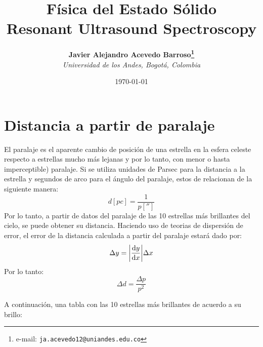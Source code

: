 \documentclass[12pt]{article}
\begin{document}
\title{Física del Estado Sólido \\ Resonant Ultrasound Spectroscopy}

\author{
\textbf{Javier Alejandro Acevedo Barroso\thanks{e-mail: \texttt{ja.acevedo12@uniandes.edu.co}}}\\
\textit{Universidad de los Andes, Bogotá, Colombia}\\
 }%

\date{\today}
\maketitle %


\normalsize
\newpage



\section{Distancia a partir de paralaje}
El paralaje es el aparente cambio de posición de una estrella en la esfera celeste respecto a estrellas mucho más lejanas y por lo tanto, con menor o hasta imperceptible) paralaje. Si se utiliza unidades de Parsec para la distancia a la estrella y segundos de arco para el ángulo del paralaje, estos de relacionan de la siguiente manera:
\begin{equation}
\label{paralaxToDistance}
d[pc] = \frac{1}{p['']}
\end{equation}
Por lo tanto, a partir de datos del paralaje de las 10 estrellas más brillantes del cielo, se puede obtener su distancia. Haciendo uso de teorias de dispersión de error, el error de la distancia calculada a partir del paralaje estará dado por:
\begin{equation}
\Delta y =\abs{\dv{y}{x}} \Delta x
\end{equation}
Por lo tanto:
\begin{equation}
\Delta d = \frac{\Delta p}{p^2}
\end{equation}

A continuación, una tabla con las 10 estrellas más brillantes de acuerdo a su brillo:
\end{document}
